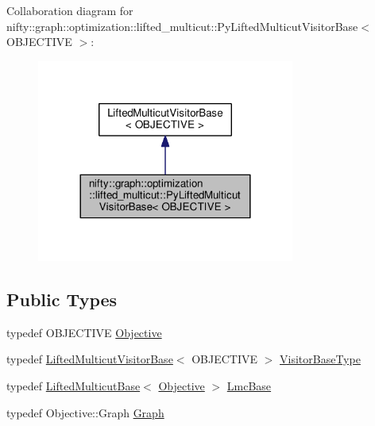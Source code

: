 Collaboration diagram for nifty\+:\+:graph\+:\+:optimization\+:\+:lifted\+\_\+multicut\+:\+:Py\+Lifted\+Multicut\+Visitor\+Base$<$ O\+B\+J\+E\+C\+T\+I\+V\+E $>$\+:\nopagebreak
\begin{figure}[H]
\begin{center}
\leavevmode
\includegraphics[width=240pt]{classnifty_1_1graph_1_1optimization_1_1lifted__multicut_1_1PyLiftedMulticutVisitorBase__coll__graph}
\end{center}
\end{figure}
\subsection*{Public Types}
\begin{DoxyCompactItemize}
\item 
typedef O\+B\+J\+E\+C\+T\+I\+V\+E \hyperlink{classnifty_1_1graph_1_1optimization_1_1lifted__multicut_1_1PyLiftedMulticutVisitorBase_a49da043bc8b319cac8134f81f7df70ad}{Objective}
\item 
typedef \hyperlink{namespacenifty_1_1graph_1_1optimization_1_1lifted__multicut_a7fba9b4f2086d28c7448955f4af4a0de}{Lifted\+Multicut\+Visitor\+Base}$<$ O\+B\+J\+E\+C\+T\+I\+V\+E $>$ \hyperlink{classnifty_1_1graph_1_1optimization_1_1lifted__multicut_1_1PyLiftedMulticutVisitorBase_a0b7aa7614030a14cf54f80ac024c5469}{Visitor\+Base\+Type}
\item 
typedef \hyperlink{classnifty_1_1graph_1_1optimization_1_1lifted__multicut_1_1LiftedMulticutBase}{Lifted\+Multicut\+Base}$<$ \hyperlink{classnifty_1_1graph_1_1optimization_1_1lifted__multicut_1_1PyLiftedMulticutVisitorBase_a49da043bc8b319cac8134f81f7df70ad}{Objective} $>$ \hyperlink{classnifty_1_1graph_1_1optimization_1_1lifted__multicut_1_1PyLiftedMulticutVisitorBase_a18c026203096e615e751d9a320074443}{Lmc\+Base}
\item 
typedef Objective\+::\+Graph \hyperlink{classnifty_1_1graph_1_1optimization_1_1lifted__multicut_1_1PyLiftedMulticutVisitorBase_a5640dc1803af4f3a7724d0fd80b357b2}{Graph}
\end{DoxyCompactItemize}
